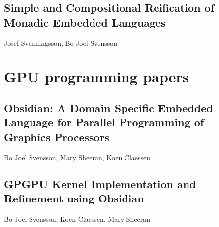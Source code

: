 \documentclass[a4paper]{book}
\newcommand{\paperBB}{Simple and Compositional Reification of Monadic Embedded Languages}
\newcommand{\paperIFL}{Obsidian: A Domain Specific Embedded Language for Parallel Programming of Graphics Processors}
\newcommand{\paperPAPP}{GPGPU Kernel Implementation and Refinement using Obsidian}
\begin{document}
\section{\paperBB}
\label{sec:paperBB}

\begin{center} 
Josef Svenningsson, Bo Joel Svensson
\end{center}






\chapter{GPU programming papers}
\label{chap:GPUProgramming}

% 
\cleardoublepage 

\section{\paperIFL}
\label{sec:paperIFL}

\begin{center} 
Bo Joel Svensson, Mary Sheeran, Koen Claessen
\end{center}



% 
\cleardoublepage 

\section{\paperPAPP}
\label{sec:paperPAPP}

\begin{center} 
Bo Joel Svensson, Koen Claessen, Mary Sheeran
\end{center}




% 
\cleardoublepage 
\end{document}
